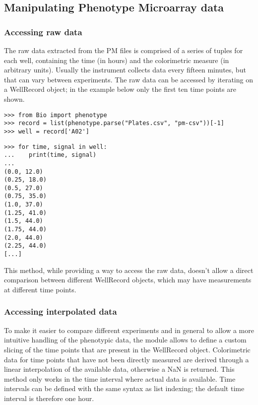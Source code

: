 \subsection{Manipulating Phenotype Microarray data}

\subsubsection{Accessing raw data}
The raw data extracted from the PM files is comprised of a series of tuples for each well,
containing the time (in hours) and the colorimetric measure (in arbitrary units).
Usually the instrument collects data every fifteen minutes, but that can vary between
experiments. The raw data can be accessed by iterating on a WellRecord object;
in the example below only the first ten time points are shown.

\begin{verbatim}
>>> from Bio import phenotype
>>> record = list(phenotype.parse("Plates.csv", "pm-csv"))[-1]
>>> well = record['A02']  
\end{verbatim}
\begin{verbatim}
>>> for time, signal in well:
...    print(time, signal)
...
(0.0, 12.0)
(0.25, 18.0)
(0.5, 27.0)
(0.75, 35.0)
(1.0, 37.0)
(1.25, 41.0)
(1.5, 44.0)
(1.75, 44.0)
(2.0, 44.0)
(2.25, 44.0)
[...]
\end{verbatim}

This method, while providing a way to access the raw data, doesn't allow a direct
comparison between different WellRecord objects, which may have measurements at
different time points.

\subsubsection{Accessing interpolated data}
To make it easier to compare different experiments and in general to allow a more intuitive handling
of the phenotypic data, the module allows to define a custom slicing of the time points that are present
in the WellRecord object. Colorimetric data for time points that have not been directly measured are
derived through a linear interpolation of the available data, otherwise a NaN is returned.
This method only works in the time interval where actual data is available.
Time intervals can be defined with the same syntax as list
indexing; the default time interval is therefore one hour.

